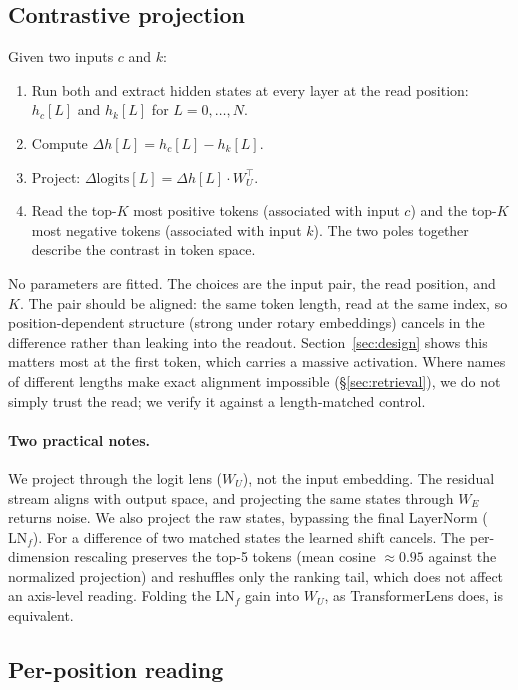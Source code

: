 \documentclass[11pt]{article}
\newcommand{\dhh}{\Delta h}
\newcommand{\WU}{W_U}
\begin{document}
\subsection{Contrastive projection}

Given two inputs $c$ and $k$:

\begin{enumerate}[leftmargin=*]
\item Run both and extract hidden states at every layer at the read position:
   $h_c[L]$ and $h_k[L]$ for $L = 0, \dots, N$.
\item Compute $\dhh[L] = h_c[L] - h_k[L]$.
\item Project: $\Delta\text{logits}[L] = \dhh[L] \cdot \WU^\top$.
\item Read the top-$K$ most positive tokens (associated with input $c$) and the
   top-$K$ most negative tokens (associated with input $k$). The two poles
   together describe the contrast in token space.
\end{enumerate}

No parameters are fitted. The choices are the input pair, the read position, and $K$.
The pair should be aligned: the same token length, read at the same index, so
position-dependent structure (strong under rotary embeddings) cancels in the
difference rather than leaking into the readout. Section~\ref{sec:design} shows
this matters most at the first token, which carries a massive activation. Where
names of different lengths make exact alignment impossible
(\S\ref{sec:retrieval}), we do not simply trust the read; we verify it against a
length-matched control.

\paragraph{Two practical notes.} We project through the logit lens ($\WU$),
not the input embedding. The residual stream aligns with output space, and
projecting the same states through $W_E$ returns noise. We also project the raw
states, bypassing the final LayerNorm ($\text{LN}_f$). For a difference of two
matched states the learned shift cancels. The per-dimension rescaling preserves
the top-5 tokens (mean cosine $\approx 0.95$ against the normalized projection)
and reshuffles only the ranking tail, which does not affect an axis-level
reading. Folding the $\text{LN}_f$ gain into $\WU$, as TransformerLens does, is
equivalent.

\subsection{Per-position reading}
\end{document}
